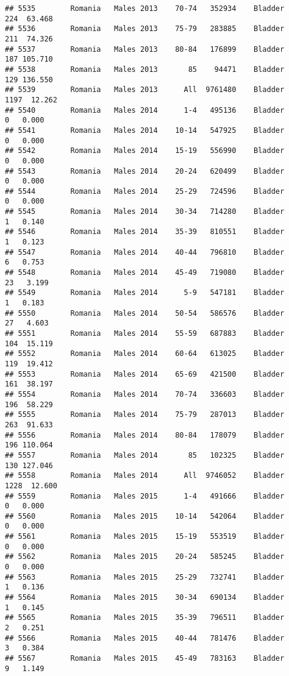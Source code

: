 \documentclass[
]{article}
\begin{document}
\begin{verbatim}
## 5535        Romania   Males 2013    70-74   352934    Bladder    224  63.468
## 5536        Romania   Males 2013    75-79   283885    Bladder    211  74.326
## 5537        Romania   Males 2013    80-84   176899    Bladder    187 105.710
## 5538        Romania   Males 2013       85    94471    Bladder    129 136.550
## 5539        Romania   Males 2013      All  9761480    Bladder   1197  12.262
## 5540        Romania   Males 2014      1-4   495136    Bladder      0   0.000
## 5541        Romania   Males 2014    10-14   547925    Bladder      0   0.000
## 5542        Romania   Males 2014    15-19   556990    Bladder      0   0.000
## 5543        Romania   Males 2014    20-24   620499    Bladder      0   0.000
## 5544        Romania   Males 2014    25-29   724596    Bladder      0   0.000
## 5545        Romania   Males 2014    30-34   714280    Bladder      1   0.140
## 5546        Romania   Males 2014    35-39   810551    Bladder      1   0.123
## 5547        Romania   Males 2014    40-44   796810    Bladder      6   0.753
## 5548        Romania   Males 2014    45-49   719080    Bladder     23   3.199
## 5549        Romania   Males 2014      5-9   547181    Bladder      1   0.183
## 5550        Romania   Males 2014    50-54   586576    Bladder     27   4.603
## 5551        Romania   Males 2014    55-59   687883    Bladder    104  15.119
## 5552        Romania   Males 2014    60-64   613025    Bladder    119  19.412
## 5553        Romania   Males 2014    65-69   421500    Bladder    161  38.197
## 5554        Romania   Males 2014    70-74   336603    Bladder    196  58.229
## 5555        Romania   Males 2014    75-79   287013    Bladder    263  91.633
## 5556        Romania   Males 2014    80-84   178079    Bladder    196 110.064
## 5557        Romania   Males 2014       85   102325    Bladder    130 127.046
## 5558        Romania   Males 2014      All  9746052    Bladder   1228  12.600
## 5559        Romania   Males 2015      1-4   491666    Bladder      0   0.000
## 5560        Romania   Males 2015    10-14   542064    Bladder      0   0.000
## 5561        Romania   Males 2015    15-19   553519    Bladder      0   0.000
## 5562        Romania   Males 2015    20-24   585245    Bladder      0   0.000
## 5563        Romania   Males 2015    25-29   732741    Bladder      1   0.136
## 5564        Romania   Males 2015    30-34   690134    Bladder      1   0.145
## 5565        Romania   Males 2015    35-39   796511    Bladder      2   0.251
## 5566        Romania   Males 2015    40-44   781476    Bladder      3   0.384
## 5567        Romania   Males 2015    45-49   783163    Bladder      9   1.149

\end{verbatim}
\end{document}
